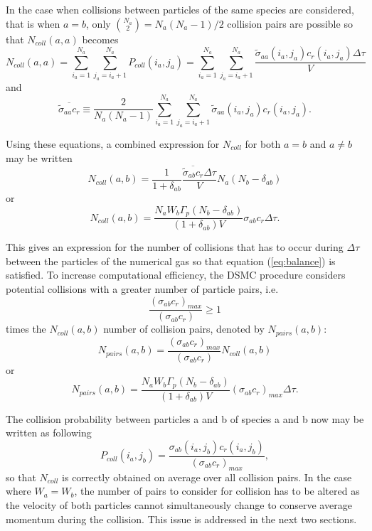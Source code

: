 \documentclass[12pt]{article}
\begin{document}
In the case when collisions between particles of the same species are
considered, that is when $a = b$, only $\binom{N_a}{2} = N_a(N_a-1)/2$
collision pairs are possible so that $N_{coll}(a, a)$ becomes
\begin{equation}
  N_{coll}(a, a) = \sum_{i_a=1}^{N_a}\sum_{j_a=i_a+1}^{N_a} P_{coll}(i_a, j_a) =
  \sum_{i_a=1}^{N_a}\sum_{j_a=i_a+1}^{N_a}\frac{{\tilde\sigma}_{aa}(i_a, j_a)
    c_r(i_a, j_a)\Delta\tau}{V}
\end{equation}
and
\begin{equation}
  \overline{\tilde{\sigma}_{aa} c_r} \equiv
  \frac{2}{N_a (N_a-1)}
  \sum_{i_a=1}^{N_a}\sum_{j_a=i_a+1}^{N_a} {\tilde\sigma}_{aa}(i_a, j_a)
  c_r(i_a, j_a).
\end{equation}

Using these equations, a combined expression for $N_{coll}$ for both
$a=b$ and $a\not=b$ may be written
\begin{equation}
  N_{coll}(a, b) = \frac{1}{1+\delta_{ab}}
  \frac{\overline{\tilde{\sigma}_{ab}c_r}\Delta\tau}{V} N_a(N_b - \delta_{ab})
\end{equation}
or
\begin{equation}
  N_{coll}(a, b) = \frac{N_a W_b\Gamma_p(N_b - \delta_{ab})}{(1+\delta_{ab})V}
  \sigma_{ab}c_r\Delta\tau.
\end{equation}

This gives an expression for the number of collisions that has to
occur during $\Delta\tau$ between the particles of the numerical gas
so that equation (\ref{eq:balance}) is satisfied. To increase
computational efficiency, the DSMC procedure considers potential
collisions with a greater number of particle pairs, i.e.
\[
\frac{(\sigma_{ab}c_r)_{max}}{(\sigma_{ab}c_r)} \ge 1
\]
times the $N_{coll}(a, b)$ number of collision pairs, denoted by
$N_{pairs}(a, b)$:
\begin{equation}
  N_{pairs}(a, b) = \frac{(\sigma_{ab}c_r)_{max}}{(\sigma_{ab}c_r)} N_{coll}(a, b)
\end{equation}
or
\begin{equation}
  N_{pairs}(a, b) = \frac{N_a W_b\Gamma_p(N_b - \delta_{ab})}{(1+\delta_{ab})V}
  (\sigma_{ab}c_r)_{max}\Delta\tau.
\end{equation}

The collision probability between particles a and b of species a and b
now may be written as following
\begin{equation}
  P_{coll}(i_a, j_b) = \frac{\sigma_{ab}(i_a, j_b) c_r(i_a,
    j_b)}{(\sigma_{ab}c_r)_{max}},
\end{equation}
so that $N_{coll}$ is correctly obtained on average over all collision
pairs. In the case where $W_a = W_b$, the number of pairs to consider
for collision has to be altered as the velocity of both particles
cannot simultaneously change to conserve average momentum during the
collision. This issue is addressed in the next two sections.
\end{document}
